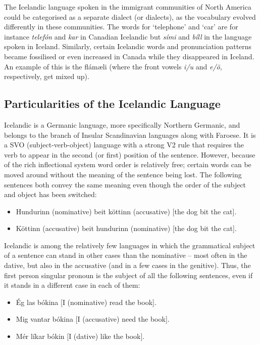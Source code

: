 \documentclass{../../metanetpaper}
\begin{document}
\begin{multicols}{2}
The Icelandic language spoken in the immigrant communities of North America could be categorised as a separate dialect (or dialects), as the vocabulary evolved differently in these communities. The words for ‘telephone’ and ‘car’ are for instance \textit{telefón} and \textit{kar} in Canadian Icelandic but \textit{sími} and \textit{bíll} in the language spoken in Iceland. Similarly, certain Icelandic words and pronunciation patterns became fossilised or even increased in Canada while they disappeared in Iceland. An example of this is the flámæli (where the front vowels \textit{i/u} and \textit{e/ö}, respectively, get mixed up).

\subsection{Particularities of the Icelandic Language}

Icelandic is a Germanic language, more specifically Northern Germanic, and belongs to the branch of Insular Scandinavian languages along with Faroese. It is a SVO (subject-verb-object) language with a strong V2 rule that requires the verb to appear in the second (or first) position of the sentence. However, because of the rich inflectional system word order is relatively free; certain words can be moved around without the meaning of the sentence being lost. The following sentences both convey the same meaning even though the order of the subject and object has been switched:

\begin{itemize}
\item Hundurinn (nominative) beit köttinn (accusative) {[}the dog bit the cat{]}.
\item Köttinn (accusative) beit hundurinn (nominative) {[}the dog bit the cat{]}.
\end{itemize}

Icelandic is among the relatively few languages in which the grammatical subject of a sentence can stand in other cases than the nominative -- most often in the dative, but also in the accusative (and in a few cases in the genitive). Thus, the first person singular pronoun is the subject of all the following sentences, even if it stands in a different case in each of them:

\begin{itemize}
\item Ég las bókina {[}I (nominative) read the book{]}.
\item Mig vantar bókina {[I (accusative) need the book]}.
\item Mér líkar bókin {[I (dative) like the book]}.
\end{itemize}


\end{multicols}
\end{document}
